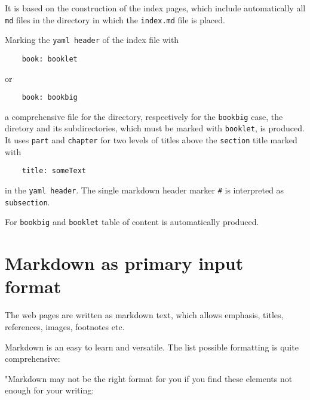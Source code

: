 \documentclass{tufte-book}
\begin{document}
It is based on the construction of the index pages, which include
automatically all \texttt{md} files in the directory in which the
\texttt{index.md} file is placed.

Marking the \texttt{yaml\ header} of the index file with

\begin{verbatim}
	book: booklet 
\end{verbatim}

or

\begin{verbatim}
	book: bookbig
\end{verbatim}

a comprehensive file for the directory, respectively for the
\texttt{bookbig} case, the diretory and its subdirectories, which must
be marked with \texttt{booklet}, is produced. It uses \texttt{part} and
\texttt{chapter} for two levels of titles above the \texttt{section}
title marked with

\begin{verbatim}
	title: someText 
\end{verbatim}

in the \texttt{yaml\ header}. The single markdown header marker
\texttt{\#} is interpreted as \texttt{subsection}.

For \texttt{bookbig} and \texttt{booklet} table of content is
automatically produced.

\chapter{Markdown as primary input format}
\begin{mdframed}The web pages are written as markdown text, which allows emphasis, titles, references, images, footnotes etc.\end{mdframed}
Markdown is an easy to learn and versatile. The list possible formatting
is quite comprehensive:

"Markdown may not be the right format for you if you find these elements
not enough for your writing:
\end{document}

